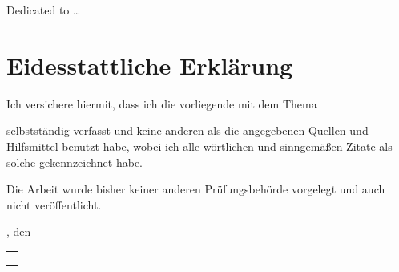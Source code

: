 \thispagestyle{empty}
\vspace*{\fill}
\begin{center}

Dedicated to \ldots

\end{center}
\vspace*{\fill}

\cleardoublepage

\chapter*{Eidesstattliche Erklärung}

Ich versichere hiermit, dass ich die vorliegende \subjectDocument{} mit dem Thema
\begin{quote}
	\textbf{\titleDocument}
\end{quote}

selbstständig verfasst und keine anderen als die angegebenen Quellen und Hilfsmittel benutzt habe, wobei ich alle wörtlichen und sinngemäßen Zitate als solche gekennzeichnet habe.

Die Arbeit wurde bisher keiner anderen Prüfungsbehörde vorgelegt und auch nicht veröffentlicht.



\vspace{1cm}
\locationDocument, den \dateDocument

\begin{tabular}{@{}p{11cm}@{}}
	\vspace{1.4cm}
	\hrulefill \\
	\textbf{\authorDocument}\\
	\institution \\
\end{tabular}

\null\vfill
\clearpage
